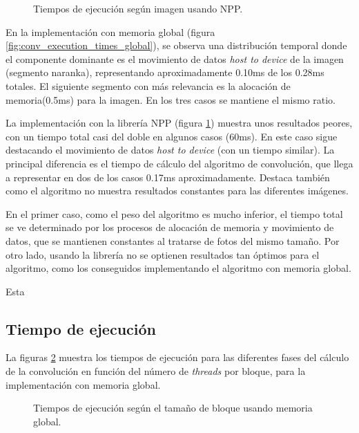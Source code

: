         \begin{figure}[H]
            \centering
            \caption{Tiempos de ejecución según imagen usando NPP.}
            \label{fig:conv_execution_times_npp}
        \end{figure}

        En la implementación con memoria global (figura \ref{fig:conv_execution_times_global}), se observa una distribución temporal donde el componente dominante es el movimiento de datos \textit{host to device} de la imagen (segmento naranka), representando aproximadamente 0.10ms de los 0.28ms totales. El siguiente segmento con más relevancia es la alocación de memoria(0.5ms) para la imagen. En los tres casos se mantiene el mismo ratio.

        La implementación con la librería NPP (figura \ref{fig:conv_execution_times_npp}) muestra unos resultados peores, con un tiempo total casi del doble en algunos casos (60ms). En este caso sigue destacando el movimiento de datos \textit{host to device} (con un tiempo similar). La principal diferencia es el tiempo de cálculo del algoritmo de convolución, que llega a representar en dos de los casos 0.17ms aproximadamente. Destaca también como el algoritmo no muestra resultados constantes para las diferentes imágenes.

        En el primer caso, como el peso del algoritmo es mucho inferior, el tiempo total se ve determinado por los procesos de alocación de memoria y movimiento de datos, que se mantienen constantes al tratarse de fotos del mismo tamaño. Por otro lado, usando la librería no se optienen resultados tan óptimos para el algoritmo, como los conseguidos implementando el algoritmo con memoria global.


        Esta 
        
        

    \subsection{Tiempo de ejecución}

        La figuras \ref{fig:conv_mem_bloc} muestra los tiempos de ejecución para las diferentes fases del cálculo de la convolución en función del número de \textit{threads} por bloque, para la implementación con memoria global.

        \begin{figure}[H]
            \centering
            \caption{Tiempos de ejecución según el tamaño de bloque usando memoria global.}
            \label{fig:conv_mem_bloc}
        \end{figure}
        
